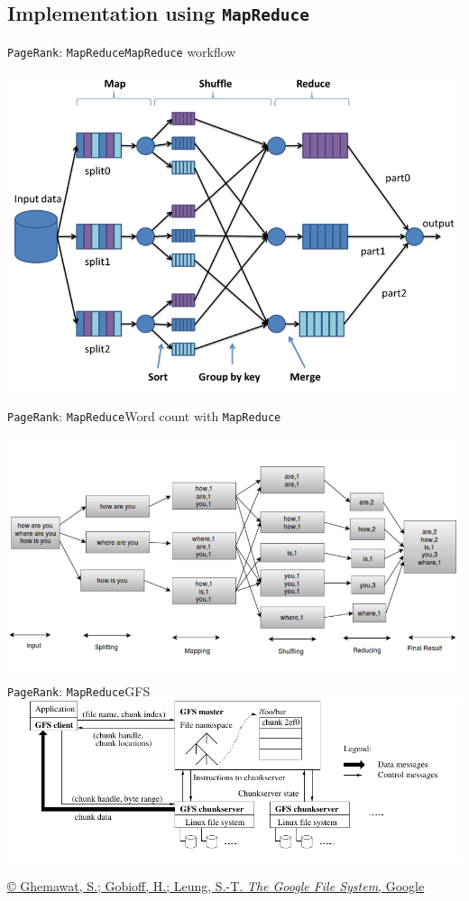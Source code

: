 \documentclass[xcolor=table,final]{beamer} %
\newcommand{\PageRank}{\texttt{PageRank}\xspace}
\newcommand{\MapReduce}{\texttt{MapReduce}\xspace}
\begin{document}
\subsection{Implementation using \MapReduce}
\begin{frame}{\PageRank : \MapReduce}{\MapReduce workflow}
  \begin{center}
    \includegraphics[width=.9\textwidth]{figs/extras/mapreduce}
  \end{center}
\end{frame}
\begin{frame}{\PageRank : \MapReduce}{Word count with \MapReduce}
  \begin{center}
    \includegraphics[width=1.0\textwidth]{figs/extras/mapreduce-wc}
  \end{center}
\end{frame}
\begin{frame}{\PageRank : \MapReduce}{GFS}
    \includegraphics[width=1.12\textwidth]{figs/pdf/gfs}%

    \href{http://static.googleusercontent.com/media/research.google.com/en//archive/gfs-sosp2003.pdf}{\tiny \copyright 
      Ghemawat, S.; Gobioff, H.; Leung, S.-T. \textit{The Google File System}, Google}
\end{frame}
\end{document}
